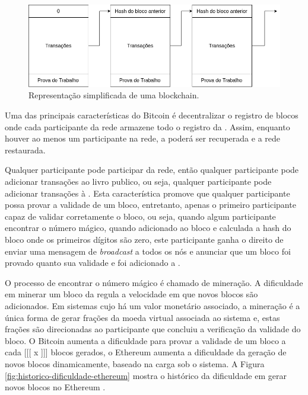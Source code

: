 \documentclass[tcc,capa]{texufpel}
\begin{document}
	\begin{figure}[h!]
        \centering
        \includegraphics[width=15cm]{imagens/blockchain-basico.png}
        \caption{Representação simplificada de uma blockchain.}
        \label{fig:blockchain-basica}
    \end{figure}
    
    Uma das principais características do Bitcoin é decentralizar o registro de blocos onde cada participante da rede armazene todo o registro da \bchain. Assim, enquanto houver ao menos um participante na rede, a \bchain poderá ser recuperada e a rede restaurada.
    
    Qualquer participante pode participar da rede, então qualquer participante pode adicionar transações ao livro publico, ou seja, qualquer participante pode adicionar transações à \bchain. Esta característica promove que qualquer participante possa provar a validade de um bloco, entretanto, apenas o primeiro participante capaz de validar corretamente o bloco, ou seja, quando algum participante encontrar o número mágico, quando adicionado ao bloco e calculada a hash do bloco onde os primeiros dígitos são zero, este participante ganha o direito de enviar uma mensagem de \textit{broadcast} a todos os nós e anunciar que um bloco foi provado quanto sua validade e foi adicionado a \bchain.
    
    O processo de encontrar o número mágico é chamado de mineração. A dificuldade em minerar um bloco da \bchain regula a velocidade em que novos blocos são adicionados. Em sistemas cujo há um valor monetário associado, a mineração é a única forma de gerar frações da moeda virtual associada ao sistema e, estas frações são direcionadas ao participante que concluiu a verificação da validade do bloco. O Bitcoin aumenta a dificuldade para provar a validade de um bloco a cada [[[ x ]]] blocos gerados, o Ethereum aumenta a dificuldade da geração de novos blocos dinamicamente, baseado na carga sob o sistema. A Figura \ref{fig:historico-dificuldade-ethereum} mostra o histórico da dificuldade em gerar novos blocos no Ethereum \cite{team2017etherscan}.
    
\end{document}
